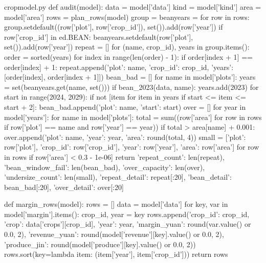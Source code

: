 \documentclass[bwprint]{gmcmthesis}
\begin{document}
\begin{appendices}
\begin{Python}{cropmodel.py}
def audit(model):
    data = model['data']
    kind = model['kind']
    area = model['area']
    rows = plan_rows(model)
    group = {}
    beanyears = {}
    for row in rows:
        group.setdefault((row['plot'], row['crop_id']), set()).add(row['year'])
        if row['crop_id'] in ed.BEAN:
            beanyears.setdefault(row['plot'], set()).add(row['year'])
    repeat = []
    for (name, crop_id), years in group.items():
        order = sorted(years)
        for index in range(len(order) - 1):
            if order[index + 1] == order[index] + 1:
                repeat.append({'plot': name, 'crop_id': crop_id, 'years': [order[index], order[index + 1]]})
    bean_bad = []
    for name in model['plots']:
        years = set(beanyears.get(name, set()))
        if bean_2023(data, name):
            years.add(2023)
        for start in range(2024, 2029):
            if not [item for item in years if start <= item <= start + 2]:
                bean_bad.append({'plot': name, 'start': start})
    over = []
    for year in model['years']:
        for name in model['plots']:
            total = sum((row['area'] for row in rows if row['plot'] == name and row['year'] == year))
            if total > area[name] + 0.001:
                over.append({'plot': name, 'year': year, 'area': round(total, 4)})
    small = [{'plot': row['plot'], 'crop_id': row['crop_id'], 'year': row['year'], 'area': row['area']} for row in rows if row['area'] < 0.3 - 1e-06]
    return {'repeat_count': len(repeat), 'bean_window_fail': len(bean_bad), 'over_capacity': len(over), 'undersize_count': len(small), 'repeat_detail': repeat[:20], 'bean_detail': bean_bad[:20], 'over_detail': over[:20]}

def margin_rows(model):
    rows = []
    data = model['data']
    for key, var in model['margin'].items():
        crop_id, year = key
        rows.append({'crop_id': crop_id, 'crop': data['crops'][crop_id], 'year': year, 'margin_yuan': round(var.value() or 0.0, 2), 'revenue_yuan': round(model['revenue'][key].value() or 0.0, 2), 'produce_jin': round(model['produce'][key].value() or 0.0, 2)})
    rows.sort(key=lambda item: (item['year'], item['crop_id']))
    return rows


\end{Python}
\end{appendices}
\end{document}

